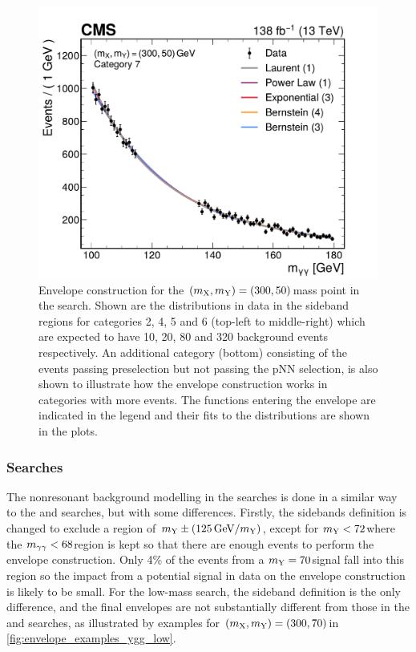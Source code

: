 \begin{figure}
  \includegraphics[width=.49\linewidth]{Figures/Dihiggs/background/envelope/y_tautau/bkgmodel_pdfs_ggttresmx300my50cat7.pdf}
  \caption[Envelope Construction for $(\mX,\mY)=(300,50)$\GeV in the \XYttHgg Search]{Envelope construction for the $(\mX,\mY)=(300,50)$\GeV mass point in the \XYttHgg search. Shown are the \mgg distributions in data in the sideband regions for categories 2, 4, 5 and 6 (top-left to middle-right) which are expected to have 10, 20, 80 and 320 background events respectively. An additional category (bottom) consisting of the events passing preselection but not passing the pNN selection, is also shown to illustrate how the envelope construction works in categories with more events. The functions entering the envelope are indicated in the legend and their fits to the \mgg distributions are shown in the plots.}\label{fig:envelope_examples_ytt}
\end{figure}

\subsubsection{\XYggHtt Searches}

The nonresonant background modelling in the \XYggHtt searches is done in a similar way to the \XHH and \XYttHgg searches, but with some differences. Firstly, the sidebands definition is changed to exclude a region of $m_{\mathrm{Y}} \pm (125\,\text{Ge\hspace{-.08em}V}/m_{\mathrm{Y}})$, except for $m_{\mathrm{Y}} < 72$\GeV where the $m_{\gamma\gamma} < 68$\GeV region is kept so that there are enough events to perform the envelope construction. Only 4\% of the events from a $m_{\mathrm{Y}}=70$\GeV signal fall into this region so the impact from a potential signal in data on the envelope construction is likely to be small. For the low-mass search, the sideband definition is the only difference, and the final envelopes are not substantially different from those in the \XHH and \XYttHgg searches, as illustrated by examples for $(m_{\mathrm{X}},m_{\mathrm{Y}})=(300,70)$\GeV in \cref{fig:envelope_examples_ygg_low}.

